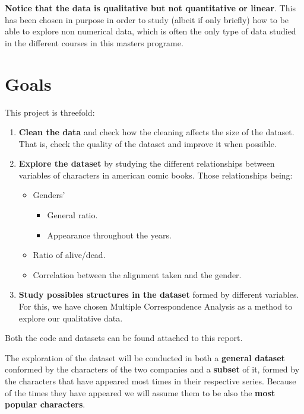 \textbf{Notice that the data is qualitative but not quantitative or linear}. This has been chosen in purpose in order to study (albeit if only briefly) how to be able to explore non numerical data, which is often the only type of data studied in the different courses in this masters programe.

\section{Goals}

This project is threefold:
\begin{enumerate}
  \item \textbf{Clean the data} and check how the cleaning affects the size of the dataset. That is, check the quality of the dataset and improve it when possible.\\
  \item \textbf{Explore the dataset} by studying the different relationships between variables of characters in american comic books. Those relationships being:
    \begin{itemize}
    \item Genders'
    \begin{itemize}
      \item General ratio.
      \item Appearance throughout the years.
    \end{itemize}
  
    \item Ratio of alive/dead.
    \item Correlation between the alignment taken and the gender.\\
    
  \end{itemize}
 \item \textbf{Study possibles structures in the dataset} formed by different variables. For this, we have chosen Multiple Correspondence Analysis as a method to explore our qualitative data.\\
\end{enumerate}

Both the code and datasets can be found attached to this report.

The exploration of the dataset will be conducted in both a \textbf{general dataset} conformed by the characters of the two companies and a \textbf{subset} of it, formed by the characters that have appeared most times in their respective series. Because of the times they have appeared we will assume them to be also the \textbf{most popular characters}.

